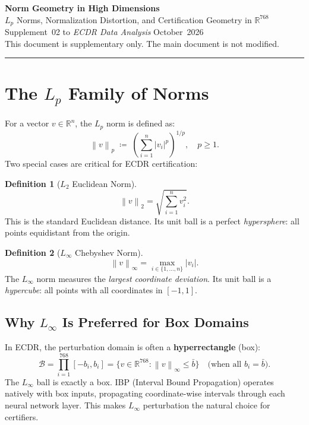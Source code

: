 \documentclass[11pt, a4paper]{article}
\theoremstyle{definition}
\newtheorem{definition}{Definition}[section]
\theoremstyle{plain}
\newcommand{\R}{\mathbb{R}}
\newcommand{\norm}[2]{\left\|#1\right\|_{#2}}
\begin{document}
\begin{center}
  {\LARGE\bfseries\color{teal} Norm Geometry in High Dimensions}\\[0.5em]
  {\large\color{muted} $L_p$ Norms, Normalization Distortion, and Certification Geometry in $\R^{768}$}\\[1.2em]
  {\normalsize Supplement~02 to \textit{ECDR Data Analysis} \textbar{} October~2026}\\[0.3em]
  {\small\color{muted} This document is supplementary only. The main document is not modified.}
\end{center}

\vspace{1em}\hrule\vspace{1em}

\tableofcontents
\clearpage

\section{The $L_p$ Family of Norms}

For a vector $v \in \R^n$, the $L_p$ norm is defined as:
\begin{equation}
  \norm{v}{p} \;\coloneqq\; \left(\sum_{i=1}^n |v_i|^p\right)^{1/p}, \quad p \ge 1.
\end{equation}
Two special cases are critical for ECDR certification:

\begin{definition}[$L_2$ Euclidean Norm]
  \[
    \norm{v}{2} = \sqrt{\sum_{i=1}^n v_i^2}.
  \]
  This is the standard Euclidean distance. Its unit ball is a perfect
  \emph{hypersphere}: all points equidistant from the origin.
\end{definition}

\begin{definition}[$L_\infty$ Chebyshev Norm]
  \[
    \norm{v}{\infty} = \max_{i \in \{1,\ldots,n\}} |v_i|.
  \]
  The $L_\infty$ norm measures the \emph{largest coordinate deviation}.
  Its unit ball is a \emph{hypercube}: all points with all coordinates in $[-1, 1]$.
\end{definition}

\subsection{Why $L_\infty$ Is Preferred for Box Domains}

In ECDR, the perturbation domain is often a \textbf{hyperrectangle} (box):
\[
  \mathcal{B} = \prod_{i=1}^{768} [-b_i, b_i]
  = \bigl\{ v \in \R^{768} : \norm{v}{\infty} \le \bar{b} \bigr\}
  \quad \text{(when all $b_i = \bar{b}$).}
\]
The $L_\infty$ ball is exactly a box. IBP (Interval Bound Propagation) operates
natively with box inputs, propagating coordinate-wise intervals through each neural
network layer. This makes $L_\infty$ perturbation the natural choice for certifiers.
\end{document}
